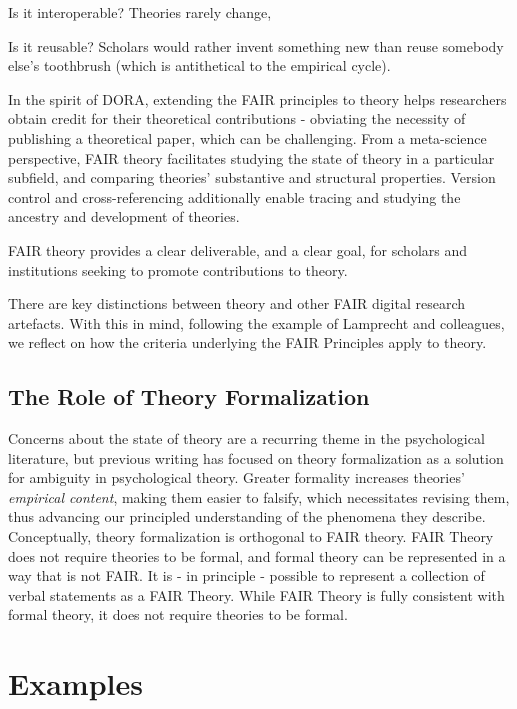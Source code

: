 \documentclass[
  man]{apa6}
\begin{document}
Is it interoperable? Theories rarely change,

Is it reusable? Scholars would rather invent something new than reuse somebody else's toothbrush (which is antithetical to the empirical cycle).

In the spirit of DORA, extending the FAIR principles to theory helps researchers obtain credit for their theoretical contributions - obviating the necessity of publishing a theoretical paper, which can be challenging.
From a meta-science perspective, FAIR theory facilitates studying the state of theory in a particular subfield, and comparing theories' substantive and structural properties. Version control and cross-referencing additionally enable tracing and studying the ancestry and development of theories.

FAIR theory provides a clear deliverable, and a clear goal, for scholars and institutions seeking to promote contributions to theory.

There are key distinctions between theory and other FAIR digital research artefacts. With this in mind, following the example of Lamprecht and colleagues, we reflect on how the criteria underlying the FAIR Principles apply to theory.

\subsection{The Role of Theory Formalization}\label{the-role-of-theory-formalization}

Concerns about the state of theory are a recurring theme in the psychological literature,
but previous writing has focused on theory formalization as a solution for ambiguity in psychological theory.
Greater formality increases theories' \emph{empirical content},
making them easier to falsify,
which necessitates revising them,
thus advancing our principled understanding of the phenomena they describe.
Conceptually, theory formalization is orthogonal to FAIR theory.
FAIR Theory does not require theories to be formal, and formal theory can be represented in a way that is not FAIR.
It is - in principle - possible to represent a collection of verbal statements as a FAIR Theory.
While FAIR Theory is fully consistent with formal theory, it does not require theories to be formal.

\section{Examples}\label{examples}
\end{document}
